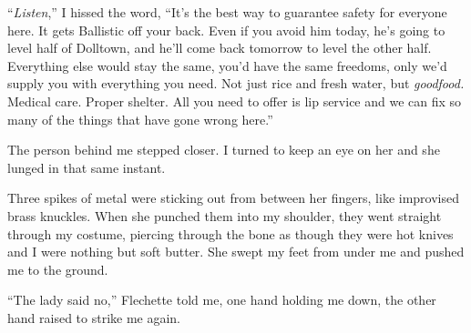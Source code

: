 ``\emph{Listen},'' I hissed the word, ``It's the best way to guarantee safety for everyone here.  It gets Ballistic off your back.  Even if you avoid him today, he's going to level half of Dolltown, and he'll come back tomorrow to level the other half.  Everything else would stay the same, you'd have the same freedoms, only we'd supply you with everything you need.  Not just rice and fresh water, but \emph{good}\emph{food.  }Medical care.  Proper shelter.  All you need to offer is lip service and we can fix so many of the things that have gone wrong here.''



The person behind me stepped closer.  I turned to keep an eye on her and she lunged in that same instant.



Three spikes of metal were sticking out from between her fingers, like improvised brass knuckles.  When she punched them into my shoulder, they went straight through my costume, piercing through the bone as though they were hot knives and I were nothing but soft butter.  She swept my feet from under me and pushed me to the ground.



``The lady said no,'' Flechette told me, one hand holding me down, the other hand raised to strike me again.





